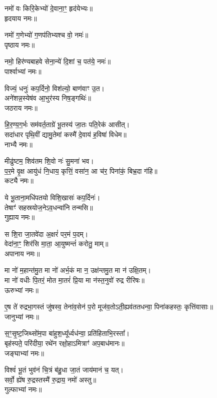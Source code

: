 नमो॑ वः किरि॒केभ्यो॑ दे॒वाना॒ꣳ॒ हृद॑येभ्यः॥\\
हृदयाय नमः॥

नमो॑ ग॒णेभ्यो॑ ग॒णप॑तिभ्यश्च वो॒ नमः॑॥\\
पृष्ठाय नमः॥

नमो॒ हिर॑ण्यबाहवे सेना॒न्ये॑ दि॒शां च॒ पत॑ये॒ नमः॑॥\\
पार्श्वाभ्यां नमः॥

विज्यं॒ धनुः॑ कप॒र्दिनो॒ विश॑ल्यो॒ बाण॑वाꣳ उ॒त।\\
अने॑शन्न॒स्येष॑व आ॒भुर॑स्य निष॒ङ्गथिः॑॥\\
जठराय नमः॥

हि॒र॒ण्य॒ग॒र्भः सम॑वर्त॒ताग्रे॑ भू॒तस्य॑ जा॒तः पति॒रेक॑ आसीत्।\\
सदा॑धार पृथि॒वीं द्यामु॒तेमां कस्मै॑ दे॒वाय॑ ह॒विषा॑ विधेम॥\\
नाभ्यै नमः॥

मीढु॑ष्टम॒ शिव॑तम शि॒वो नः॑ सु॒मना॑ भव।\\
प॒र॒मे वृ॒क्ष आयु॑धं नि॒धाय॒ कृत्तिं॒ वसा॑न॒ आ च॑र॒ पिना॑कं॒ बिभ्र॒दा ग॑हि॥\\
कट्यै नमः॥

ये भू॒ताना॒मधि॑पतयो विशि॒खासः॑ कप॒र्दिनः॑। \\
तेषाꣳ॑ सहस्रयोज॒नेऽव॒धन्वा॑नि तन्मसि॥\\
गुह्याय नमः॥

स शि॒रा जा॒तवे॑दा अ॒क्षरं॑ पर॒मं प॒दम्।\\
वेदा॑ना॒ꣳ॒ शिर॑सि मा॒ता॒ आ॒युष्मन्तं॑ करोतु॒ माम्॥\\
अपानाय नमः॥

मा नो॑ म॒हान्त॑मु॒त मा नो॑ अर्भ॒कं मा न॒ उक्ष॑न्तमु॒त मा न॑ उक्षि॒तम्।\\
मा नो॑ वधीः पि॒तरं॒ मोत मा॒तरं॑ प्रि॒या मा न॑स्त॒नुवो॑ रुद्र रीरिषः॥\\
ऊरुभ्यां नमः॥

ए॒ष ते॑ रुद्रभा॒गस्तं जु॑षस्व॒ तेना॑व॒सेन॑ प॒रो मूज॑व॒तोऽती॒\-ह्यव॑ततधन्वा॒ पिना॑कहस्तः॒ कृत्ति॑वासाः॥\\
जानुभ्यां नमः॥

स॒ꣳ॒सृ॒ष्ट॒जिथ्सो॑म॒पा बा॑हुश॒ध्यू᳚र्ध्वध॑न्वा॒ प्रति॑हिताभि॒रस्ता᳚।\\
बृह॑स्पते॒ परि॑दीया॒ रथे॑न रक्षो॒हाऽमित्राꣳ॑ अप॒बाध॑मानः॥\\
जङ्घाभ्यां नमः॥

विश्वं॑ भू॒तं भुव॑नं चि॒त्रं ब॑हु॒धा जा॒तं जाय॑मानं च॒ यत्।\\
सर्वो॒ ह्ये॑ष रु॒द्रस्तस्मै॑ रु॒द्राय॒ नमो॑ अस्तु॥\\
गुल्फाभ्यां नमः॥

